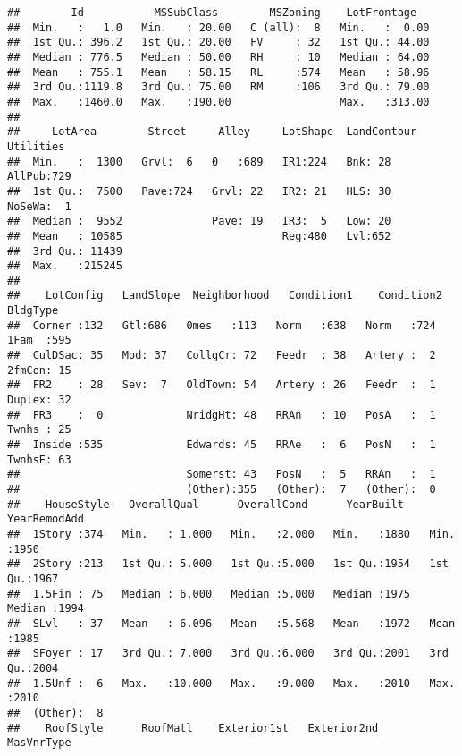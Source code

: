 \documentclass[]{article}
\begin{document}
\begin{verbatim}
##        Id           MSSubClass        MSZoning    LotFrontage    
##  Min.   :   1.0   Min.   : 20.00   C (all):  8   Min.   :  0.00  
##  1st Qu.: 396.2   1st Qu.: 20.00   FV     : 32   1st Qu.: 44.00  
##  Median : 776.5   Median : 50.00   RH     : 10   Median : 64.00  
##  Mean   : 755.1   Mean   : 58.15   RL     :574   Mean   : 58.96  
##  3rd Qu.:1119.8   3rd Qu.: 75.00   RM     :106   3rd Qu.: 79.00  
##  Max.   :1460.0   Max.   :190.00                 Max.   :313.00  
##                                                                  
##     LotArea        Street     Alley     LotShape  LandContour  Utilities  
##  Min.   :  1300   Grvl:  6   0   :689   IR1:224   Bnk: 28     AllPub:729  
##  1st Qu.:  7500   Pave:724   Grvl: 22   IR2: 21   HLS: 30     NoSeWa:  1  
##  Median :  9552              Pave: 19   IR3:  5   Low: 20                 
##  Mean   : 10585                         Reg:480   Lvl:652                 
##  3rd Qu.: 11439                                                           
##  Max.   :215245                                                           
##                                                                           
##    LotConfig   LandSlope  Neighborhood   Condition1    Condition2    BldgType  
##  Corner :132   Gtl:686   0mes   :113   Norm   :638   Norm   :724   1Fam  :595  
##  CulDSac: 35   Mod: 37   CollgCr: 72   Feedr  : 38   Artery :  2   2fmCon: 15  
##  FR2    : 28   Sev:  7   OldTown: 54   Artery : 26   Feedr  :  1   Duplex: 32  
##  FR3    :  0             NridgHt: 48   RRAn   : 10   PosA   :  1   Twnhs : 25  
##  Inside :535             Edwards: 45   RRAe   :  6   PosN   :  1   TwnhsE: 63  
##                          Somerst: 43   PosN   :  5   RRAn   :  1               
##                          (Other):355   (Other):  7   (Other):  0               
##    HouseStyle   OverallQual      OverallCond      YearBuilt     YearRemodAdd 
##  1Story :374   Min.   : 1.000   Min.   :2.000   Min.   :1880   Min.   :1950  
##  2Story :213   1st Qu.: 5.000   1st Qu.:5.000   1st Qu.:1954   1st Qu.:1967  
##  1.5Fin : 75   Median : 6.000   Median :5.000   Median :1975   Median :1994  
##  SLvl   : 37   Mean   : 6.096   Mean   :5.568   Mean   :1972   Mean   :1985  
##  SFoyer : 17   3rd Qu.: 7.000   3rd Qu.:6.000   3rd Qu.:2001   3rd Qu.:2004  
##  1.5Unf :  6   Max.   :10.000   Max.   :9.000   Max.   :2010   Max.   :2010  
##  (Other):  8                                                                 
##    RoofStyle      RoofMatl    Exterior1st   Exterior2nd    MasVnrType 

\end{verbatim}
\end{document}
